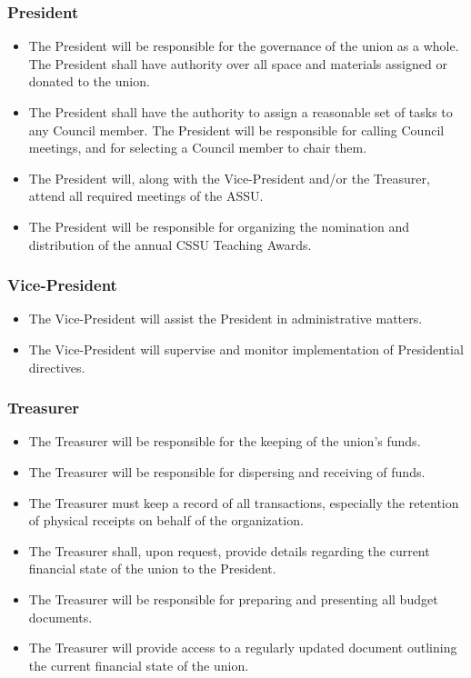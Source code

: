 \documentclass{article}
\begin{document}
\subsubsection{President }  \label{sec:2.2.1}
\begin{itemize}
    \item The President will be responsible for the governance of the union as a whole. The President shall have authority over all space and materials assigned or donated to the union. 
    \item The President shall have the authority to assign a reasonable set of tasks to any Council member. The President will be responsible for calling Council meetings, and for selecting a Council member to chair them. 
    \item The President will, along with the Vice-President and/or the Treasurer, attend all required meetings of the ASSU. 
    \item The President will be responsible for organizing the nomination and distribution of the annual CSSU Teaching Awards.
\end{itemize}
\subsubsection{Vice-President}  \label{sec:2.2.2}
\begin{itemize}
    \item The Vice-President will assist the President in administrative matters.
    \item The Vice-President will supervise and monitor implementation of Presidential directives.
\end{itemize}
\subsubsection{Treasurer} \label{sec:2.2.3}
\begin{itemize}
    \item The Treasurer will be responsible for the keeping of the union’s funds.
    \item The Treasurer will be responsible for dispersing and receiving of funds.
    \item The Treasurer must keep a record of all transactions, especially the retention of physical
    receipts on behalf of the organization.
    \item The Treasurer shall, upon request, provide details regarding the current financial state of the
    union to the President.
    \item The Treasurer will be responsible for preparing and presenting all budget documents.
    \item The Treasurer will provide access to a regularly updated document outlining the current
    financial state of the union.
\end{itemize}
\end{document}

